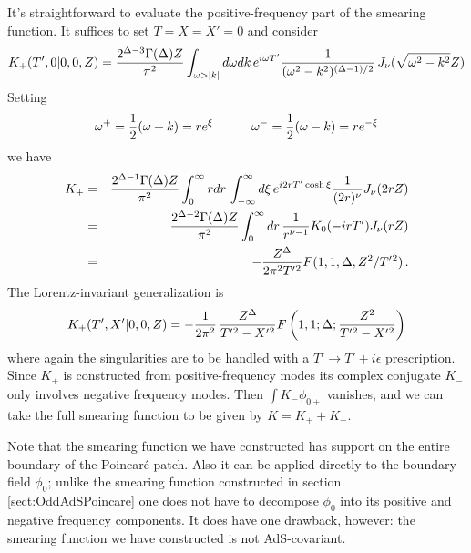 \documentclass[12pt]{article}
\newcommand{\be}{\begin{equation}}
\newcommand{\ee}{\end{equation}}
\newcommand{\beas}{\begin{eqnarray*}}
\newcommand{\eeas}{\end{eqnarray*}}
\begin{document}
It's straightforward to evaluate the positive-frequency part of the smearing function.
It suffices to set $T = X = X' = 0$ and consider
%
\be
K_+(T',0 \vert 0,0,Z) = {2^{\Delta - 3} \Gamma(\Delta) Z \over \pi^2}
\int_{\omega > \vert k \vert} d\omega dk \,
e^{i \omega T'} {1 \over (\omega^2 - k^2)^{(\Delta - 1)/2}} \,
J_\nu(\sqrt{\omega^2 - k^2} Z)
\ee
%
Setting
%
\be
\omega^+ = {1 \over 2} (\omega + k) = r e^{\xi} \qquad\quad
\omega^- = {1 \over 2} (\omega - k) = r e^{-\xi}
\ee
%
we have
%
\beas
K_+ & = & {2^{\Delta - 1} \Gamma(\Delta) Z \over \pi^2} \int_0^\infty r dr \,
\int_{-\infty}^\infty d\xi \, e^{i 2 r T' \cosh \xi} {1 \over (2 r)^\nu} J_\nu(2 r Z) \\
& = & {2^{\Delta - 2} \Gamma(\Delta) Z \over \pi^2} \int_0^\infty dr \,
{1 \over r^{\nu - 1}} K_0(-i r T') J_\nu(rZ) \\
& = & - {Z^\Delta \over 2 \pi^2 T'{}^2} F(1,1,\Delta,Z^2/T'{}^2)\,.
\eeas
%
The Lorentz-invariant generalization is
%
\be
\label{PoincareModeSum}
K_+(T',X' \vert 0,0,Z) = - {1 \over 2 \pi^2} \, {Z^\Delta \over T'{}^2 - X'{}^2}
F \left(1,1; \Delta; {Z^2 \over T'{}^2 - X'{}^2}\right)
\ee
%
where again the singularities are to be handled with a $T' \rightarrow
T' + i \epsilon$ prescription.  Since $K_+$ is constructed from
positive-frequency modes its complex conjugate $K_-$ only involves
negative frequency modes.  Then $\int K_- \phi_{0+}$ vanishes, and we
can take the full smearing function to be given by $K = K_+ + K_-$.

Note that the smearing function we have constructed has support on the
entire boundary of the Poincar\'e patch.  Also it can be applied
directly to the boundary field $\phi_0$; unlike the smearing function
constructed in section \ref{sect:OddAdSPoincare} one does not have to
decompose $\phi_0$ into its positive and negative frequency
components.  It does have one drawback, however: the smearing function
we have constructed is not AdS-covariant.
\end{document}

